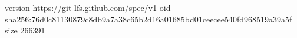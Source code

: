 version https://git-lfs.github.com/spec/v1
oid sha256:76d0c81130879c8db9a7a38c65b2d16a01685bd01ceecee540fd968519a39a5f
size 266391
